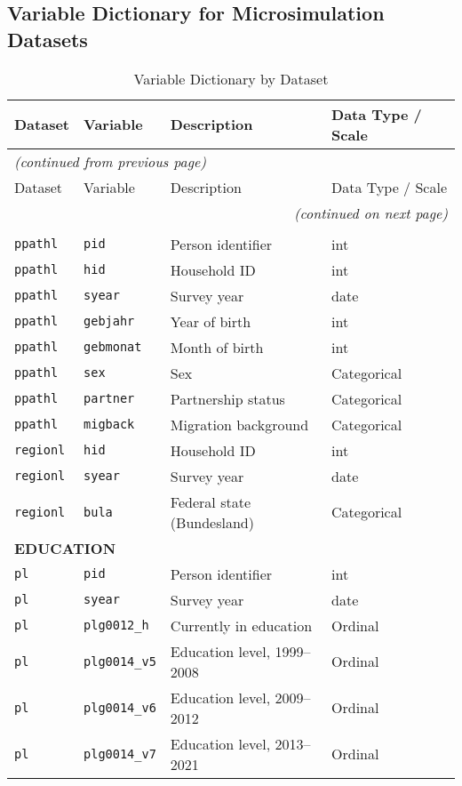 \subsection{Variable Dictionary for Microsimulation Datasets}
{\footnotesize
\begin{longtable}{llll}
\caption{Variable Dictionary by Dataset} 
\label{table:variable_dictionary} \\
\toprule
Dataset & Variable & Description & Data Type / Scale \\
\midrule
\endfirsthead

\multicolumn{4}{l}{\textit{(continued from previous page)}} \\
\toprule
Dataset & Variable & Description & Data Type / Scale \\
\midrule
\endhead

\bottomrule
\multicolumn{4}{r}{\textit{(continued on next page)}} \\
\endfoot

\bottomrule
\endlastfoot

\multicolumn{4}{l}{\textbf{IDENTIFIERS AND CORE DEMOGRAPHICS}} \\
\texttt{ppathl} & \texttt{pid} & Person identifier & int \\
\texttt{ppathl} & \texttt{hid} & Household ID & int \\
\texttt{ppathl} & \texttt{syear} & Survey year & date \\
\texttt{ppathl} & \texttt{gebjahr} & Year of birth & int \\
\texttt{ppathl} & \texttt{gebmonat} & Month of birth & int \\
\texttt{ppathl} & \texttt{sex} & Sex & Categorical \\
\texttt{ppathl} & \texttt{partner} & Partnership status & Categorical \\
\texttt{ppathl} & \texttt{migback} & Migration background & Categorical \\
\texttt{regionl} & \texttt{hid} & Household ID & int \\
\texttt{regionl} & \texttt{syear} & Survey year & date \\
\texttt{regionl} & \texttt{bula} & Federal state (Bundesland) & Categorical \\
 
\midrule
\multicolumn{4}{l}{\textbf{EDUCATION}} \\
\texttt{pl} & \texttt{pid} & Person identifier & int \\
\texttt{pl} & \texttt{syear} & Survey year & date \\
\texttt{pl} & \texttt{plg0012\_h} & Currently in education & Ordinal \\
\texttt{pl} & \texttt{plg0014\_v5} & Education level, 1999--2008 & Ordinal \\
\texttt{pl} & \texttt{plg0014\_v6} & Education level, 2009--2012 & Ordinal \\
\texttt{pl} & \texttt{plg0014\_v7} & Education level, 2013--2021 & Ordinal \\


\end{longtable}}
